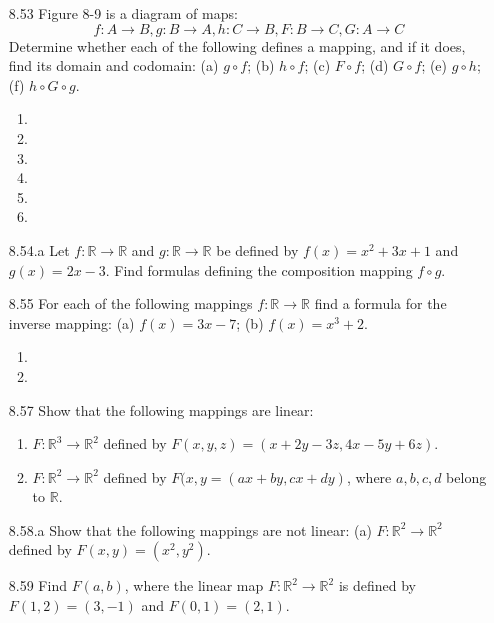 \documentclass[12pt]{article}
\begin{document}
\begin{enumerate}
\item[8.53] Figure 8-9 is a diagram of maps:
\[ f: A\rightarrow B, g: B \rightarrow A, h: C \rightarrow B, F: B\rightarrow C, G:A\rightarrow C \]
Determine whether each of the following defines a mapping, and if it does, find its domain and codomain: (a) $g \circ f$; (b) $h \circ f$; (c) $F \circ f$; (d) $G \circ f$; (e) $g \circ h$; (f) $h \circ G \circ g$.
	\begin{enumerate}
	\item
	\item
	\item
	\item
	\item
	\item
	\end{enumerate}
\item[8.54.a] Let $f: \mathbb{R} \rightarrow \mathbb{R}$ and $g: \mathbb{R} \rightarrow \mathbb{R}$ be defined by $f(x)=x^2+3x+1$ and $g(x)=2x-3$. Find formulas defining the composition mapping $f \circ g$.
\item[8.55] For each of the following mappings $f: \mathbb{R} \rightarrow \mathbb{R}$ find a formula for the inverse mapping: (a) $f(x)=3x-7$; (b) $f(x)=x^3+2$.
	\begin{enumerate}
	\item
	\item
	\end{enumerate}
\item[8.57] Show that the following mappings are linear:
	\begin{enumerate}
	\item $F: \mathbb{R}^3\rightarrow\mathbb{R}^2$ defined by $F(x,y,z)=(x+2y-3z,4x-5y+6z)$.
	\item $F:\mathbb{R}^2\rightarrow\mathbb{R}^2$ defined by $F(x,y=(ax+by,cx+dy)$, where $a,b,c,d$ belong to $\mathbb{R}$.
	\end{enumerate}
\item[8.58.a] Show that the following mappings are not linear: (a) $F:\mathbb{R}^2\rightarrow\mathbb{R}^2$ defined by $F(x,y)=(x^2,y^2)$.
\item[8.59] Find $F(a,b)$, where the linear map $F:\mathbb{R}^2 \rightarrow \mathbb{R}^2$ is defined by $F(1,2)=(3,-1)$ and $F(0,1)=(2,1)$.




\end{enumerate}
\end{document}
